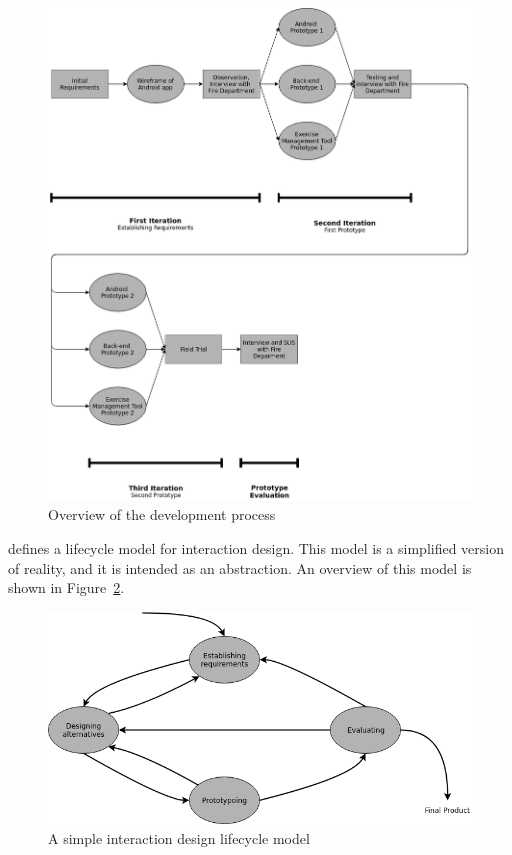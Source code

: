 \documentclass[../Main/thesis.tex]{subfiles}
\begin{document}
\begin{figure}[H]
	\centering
	\includegraphics[width=\textwidth]{../fig/Method-diagram}
	\caption{Overview of the development process}
	\label{fig:method-diagram}
\end{figure}

\citet{Preece2011} defines a lifecycle model for interaction design.
This model is a simplified version of reality, and it is intended as an abstraction.
An overview of this model is shown in Figure~\ref{fig:interaction-design-lifecycle}.

\begin{figure}[h]
	\centering
	\includegraphics[width=\textwidth]{../fig/Interaction-design-lifecycle}
	\caption[A simple interaction design lifecycle model]{A simple interaction design lifecycle model \citep[p.332]{Preece2011}}
	\label{fig:interaction-design-lifecycle}
\end{figure}
\end{document}
